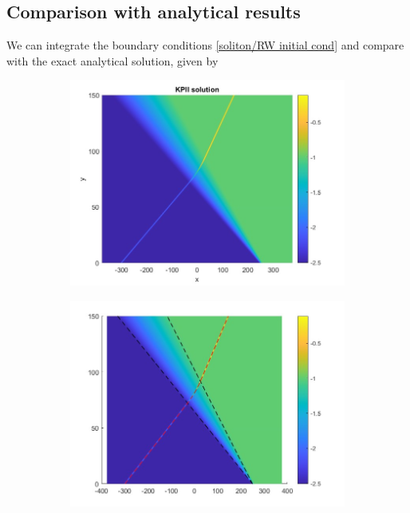 \documentclass[12pt]{article}
\numberwithin{equation}{section}
\begin{document}
\subsection{Comparison with analytical results}
We can integrate the boundary conditions \eqref{soliton/RW initial cond} and compare with the exact analytical solution, given by 



\begin{figure}[h!]
     \centering
     \begin{subfigure}[b]{.45\textwidth}
        \centering
        \includegraphics[width = \textwidth]{figures/KPII_RWsoliton_above_good.jpg}
         \caption{}
     \end{subfigure}
     \hfill
     \begin{subfigure}[b]{.45\textwidth}
        \centering
        \includegraphics[width = \textwidth]{figures/RWsolitoncomp.jpg}

\end{subfigure}
\end{figure}
\end{document}
